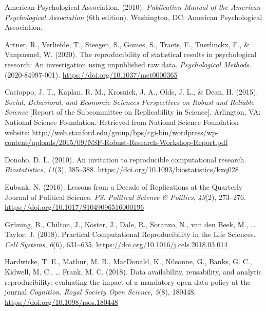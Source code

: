 \documentclass[
  ,man,floatsintext]{apa6}
\newlength{\cslhangindent}
\newlength{\cslentryspacingunit} %
\newenvironment{CSLReferences}[2] %
 {%
  \setlength{\parindent}{0pt}
  \ifodd #1
  \let\oldpar\par
  \def\par{\hangindent=\cslhangindent\oldpar}
  \fi
  \setlength{\parskip}{#2\cslentryspacingunit}
 }%
 {}
\begin{document}
\hypertarget{refs}{}
\begin{CSLReferences}{1}{0}
\leavevmode{}%
American Psychological Association. (2010). \emph{Publication Manual of the American Psychological Association} (6th edition). Washington, DC: American Psychological Association.

\leavevmode{}%
Artner, R., Verliefde, T., Steegen, S., Gomes, S., Traets, F., Tuerlinckx, F., \& Vanpaemel, W. (2020). The reproducibility of statistical results in psychological research: An investigation using unpublished raw data. \emph{Psychological Methods}. (2020-84997-001). \url{https://doi.org/10.1037/met0000365}

\leavevmode{}%
Cacioppo, J. T., Kaplan, R. M., Krosnick, J. A., Olds, J. L., \& Dean, H. (2015). \emph{Social, Behavioral, and Economic Sciences Perspectives on Robust and Reliable Science} {[}Report of the Subcommittee on Replicability in Science{]}. Arlington, VA: National Science Foundation. Retrieved from National Science Foundation website: \url{http://web.stanford.edu/group/bps/cgi-bin/wordpress/wp-content/uploads/2015/09/NSF-Robust-Research-Workshop-Report.pdf}

\leavevmode{}%
Donoho, D. L. (2010). An invitation to reproducible computational research. \emph{Biostatistics}, \emph{11}(3), 385--388. \url{https://doi.org/10.1093/biostatistics/kxq028}

\leavevmode{}%
Eubank, N. (2016). Lessons from a Decade of Replications at the Quarterly Journal of Political Science. \emph{PS: Political Science \& Politics}, \emph{49}(2), 273--276. \url{https://doi.org/10.1017/S1049096516000196}

\leavevmode{}%
Grüning, B., Chilton, J., Köster, J., Dale, R., Soranzo, N., van den Beek, M., \ldots{} Taylor, J. (2018). Practical Computational Reproducibility in the Life Sciences. \emph{Cell Systems}, \emph{6}(6), 631--635. \url{https://doi.org/10.1016/j.cels.2018.03.014}

\leavevmode{}%
Hardwicke, T. E., Mathur, M. B., MacDonald, K., Nilsonne, G., Banks, G. C., Kidwell, M. C., \ldots{} Frank, M. C. (2018). Data availability, reusability, and analytic reproducibility: evaluating the impact of a mandatory open data policy at the journal \emph{Cognition}. \emph{Royal Society Open Science}, \emph{5}(8), 180448. \url{https://doi.org/10.1098/rsos.180448}


\end{CSLReferences}
\end{document}
